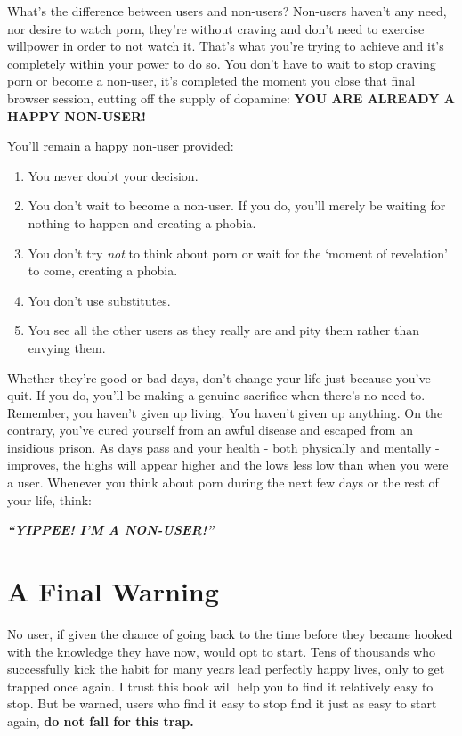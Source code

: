 \documentclass[
]{book}
\begin{document}
What's the difference between users and non-users? Non-users haven't any need, nor desire to watch porn, they're without craving and don't need to exercise willpower in order to not watch it. That's what you're trying to achieve and it's completely within your power to do so. You don't have to wait to stop craving porn or become a non-user, it's completed the moment you close that final browser session, cutting off the supply of dopamine: \textbf{YOU ARE ALREADY A HAPPY NON-USER!}

You'll remain a happy non-user provided:

\begin{enumerate}
\def\labelenumi{\arabic{enumi}.}
\item
  You never doubt your decision.
\item
  You don't wait to become a non-user. If you do, you'll merely be waiting for nothing to happen and creating a phobia.
\item
  You don't try \emph{not} to think about porn or wait for the `moment of revelation' to come, creating a phobia.
\item
  You don't use substitutes.
\item
  You see all the other users as they really are and pity them rather than envying them.
\end{enumerate}

Whether they're good or bad days, don't change your life just because you've quit. If you do, you'll be making a genuine sacrifice when there's no need to. Remember, you haven't given up living. You haven't given up anything. On the contrary, you've cured yourself from an awful disease and escaped from an insidious prison. As days pass and your health - both physically and mentally - improves, the highs will appear higher and the lows less low than when you were a user. Whenever you think about porn during the next few days or the rest of your life, think:

\textbf{\emph{``YIPPEE! I'M A NON-USER!''}}

\hypertarget{a-final-warning}{%
\section{A Final Warning}\label{a-final-warning}}

No user, if given the chance of going back to the time before they became hooked with the knowledge they have now, would opt to start. Tens of thousands who successfully kick the habit for many years lead perfectly happy lives, only to get trapped once again. I trust this book will help you to find it relatively easy to stop. But be warned, users who find it easy to stop find it just as easy to start again, \textbf{do not fall for this trap.}
\end{document}
